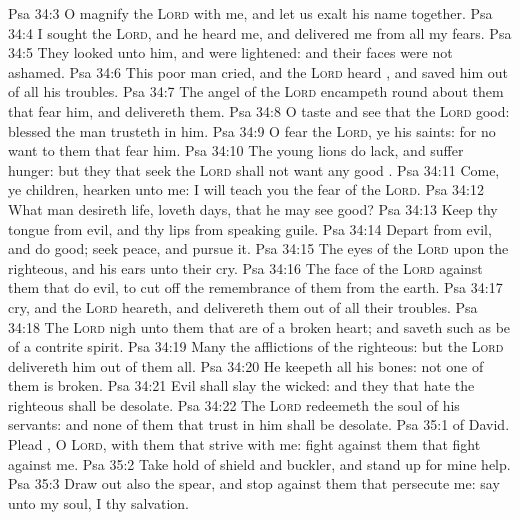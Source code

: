 \vs Psa 34:3 O magnify the \textsc{Lord} with me, and let us exalt his name together.
\vs Psa 34:4 I sought the \textsc{Lord}, and he heard me, and delivered me from all my fears.
\vs Psa 34:5 They looked unto him, and were lightened: and their faces were not ashamed.
\vs Psa 34:6 This poor man cried, and the \textsc{Lord} heard , and saved him out of all his troubles.
\vs Psa 34:7 The angel of the \textsc{Lord} encampeth round about them that fear him, and delivereth them.
\vs Psa 34:8 O taste and see that the \textsc{Lord}  good: blessed  the man  trusteth in him.
\vs Psa 34:9 O fear the \textsc{Lord}, ye his saints: for  no want to them that fear him.
\vs Psa 34:10 The young lions do lack, and suffer hunger: but they that seek the \textsc{Lord} shall not want any good .
\vs Psa 34:11 Come, ye children, hearken unto me: I will teach you the fear of the \textsc{Lord}.
\vs Psa 34:12 What man  desireth life,  loveth  days, that he may see good?
\vs Psa 34:13 Keep thy tongue from evil, and thy lips from speaking guile.
\vs Psa 34:14 Depart from evil, and do good; seek peace, and pursue it.
\vs Psa 34:15 The eyes of the \textsc{Lord}  upon the righteous, and his ears  unto their cry.
\vs Psa 34:16 The face of the \textsc{Lord}  against them that do evil, to cut off the remembrance of them from the earth.
\vs Psa 34:17  cry, and the \textsc{Lord} heareth, and delivereth them out of all their troubles.
\vs Psa 34:18 The \textsc{Lord}  nigh unto them that are of a broken heart; and saveth such as be of a contrite spirit.
\vs Psa 34:19 Many  the afflictions of the righteous: but the \textsc{Lord} delivereth him out of them all.
\vs Psa 34:20 He keepeth all his bones: not one of them is broken.
\vs Psa 34:21 Evil shall slay the wicked: and they that hate the righteous shall be desolate.
\vs Psa 34:22 The \textsc{Lord} redeemeth the soul of his servants: and none of them that trust in him shall be desolate.
\vs Psa 35:1  of David. Plead , O \textsc{Lord}, with them that strive with me: fight against them that fight against me.
\vs Psa 35:2 Take hold of shield and buckler, and stand up for mine help.
\vs Psa 35:3 Draw out also the spear, and stop  against them that persecute me: say unto my soul, I  thy salvation.
